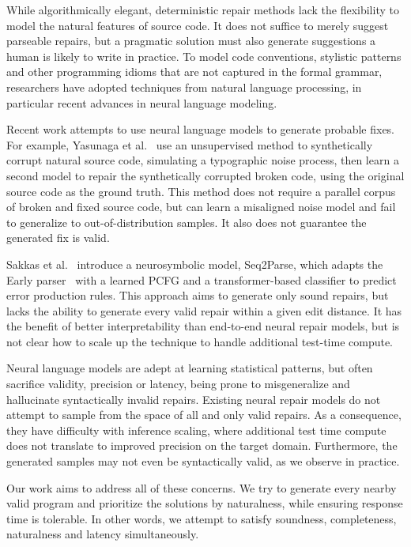 While algorithmically elegant, deterministic repair methods lack the flexibility to model the natural features of source code. It does not suffice to merely suggest parseable repairs, but a pragmatic solution must also generate suggestions a human is likely to write in practice. To model code conventions, stylistic patterns and other programming idioms that are not captured in the formal grammar, researchers have adopted techniques from natural language processing, in particular recent advances in neural language modeling.

Recent work attempts to use neural language models to generate probable fixes. For example, Yasunaga et al.~\cite{yasunaga2021break} use an unsupervised method to synthetically corrupt natural source code, simulating a typographic noise process, then learn a second model to repair the synthetically corrupted broken code, using the original source code as the ground truth. This method does not require a parallel corpus of broken and fixed source code, but can learn a misaligned noise model and fail to generalize to out-of-distribution samples. It also does not guarantee the generated fix is valid.

Sakkas et al.~\cite{sakkas2022seq2parse} introduce a neurosymbolic model, Seq2Parse, which adapts the Early parser~\cite{earley1970efficient} with a learned PCFG and a transformer-based classifier to predict error production rules. This approach aims to generate only sound repairs, but lacks the ability to generate every valid repair within a given edit distance. It has the benefit of better interpretability than end-to-end neural repair models, but is not clear how to scale up the technique to handle additional test-time compute.

Neural language models are adept at learning statistical patterns, but often sacrifice validity, precision or latency, being prone to misgeneralize and hallucinate syntactically invalid repairs. Existing neural repair models do not attempt to sample from the space of all and only valid repairs. As a consequence, they have difficulty with inference scaling, where additional test time compute does not translate to improved precision on the target domain. Furthermore, the generated samples may not even be syntactically valid, as we observe in practice.

Our work aims to address all of these concerns. We try to generate every nearby valid program and prioritize the solutions by naturalness, while ensuring response time is tolerable. In other words, we attempt to satisfy soundness, completeness, naturalness and latency simultaneously.


\clearpage